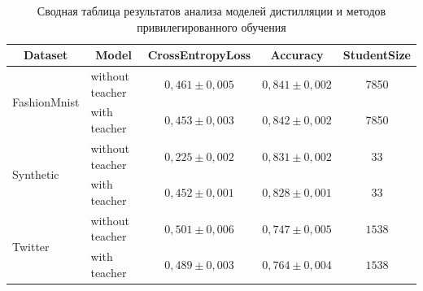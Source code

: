 \begin{table}[]
\caption{Сводная таблица результатов анализа моделей дистилляции и методов привилегированного обучения}
\label{tb:ce:1}
\begin{center}
\begin{tabular}{|l|l|c|c|c|}
\hline
\multicolumn{1}{|c|}{Dataset} & \multicolumn{1}{c|}{Model} & CrossEntropyLoss      & Accuracy    &   StudentSize   \\ \hline
\multirow{2}{*}{FashionMnist} & without teacher    &  $0{,}461 \pm 0{,}005$ & $0{,}841\pm 0{,}002$ & 7850 \\ \cline{2-5} 
                              & with teacher       & $0{,}453 \pm 0{,}003$ & $0{,}842 \pm 0{,}002$ & 7850\\ \hline
\multirow{2}{*}{Synthetic}    & without teacher    & $0{,}225 \pm 0{,}002$ & $0{,}831\pm 0{,}002$ & 33 \\ \cline{2-5} 
                              &  with teacher       & $0{,}452 \pm 0{,}001$   & $0{,}828\pm 0{,}001$ & 33 \\ \hline
\multirow{2}{*}{Twitter }    & without teacher    & $0{,}501 \pm 0{,}006$ & $0{,}747\pm 0{,}005$ & $1538$  \\ \cline{2-5} 
                              &with teacher       & $0{,}489 \pm 0{,}003$   & $0{,}764\pm 0{,}004$ & $1538$ \\ \hline
\end{tabular}
\end{center}
\end{table}
